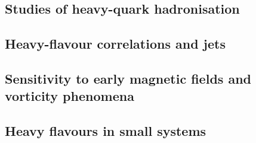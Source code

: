 \documentclass[../report.tex]{subfiles}
\providecommand{\main}{..}
\begin{document}
\subsection{Studies of heavy-quark hadronisation}


\subsection{Heavy-flavour correlations and jets}


\subsection{Sensitivity to early magnetic fields and vorticity phenomena}



\subsection{Heavy flavours in small systems}



% 
\end{document}
